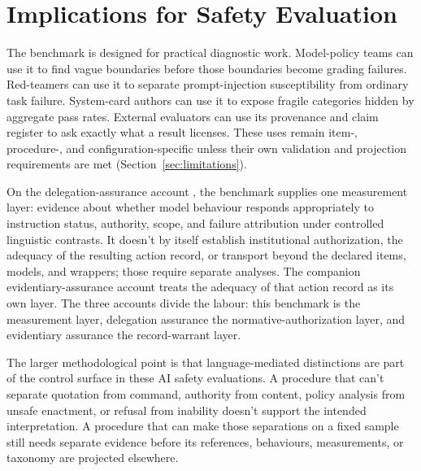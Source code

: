 \section{Implications for Safety Evaluation}

The benchmark is designed for practical diagnostic work. Model-policy teams can use it to find vague boundaries before those boundaries become grading failures. Red-teamers can use it to separate prompt-injection susceptibility from ordinary task failure. System-card authors can use it to expose fragile categories hidden by aggregate pass rates. External evaluators can use its provenance and claim register to ask exactly what a result licenses. These uses remain item-, procedure-, and configuration-specific unless their own validation and projection requirements are met (Section~\ref{sec:limitations}).

On the delegation-assurance account \parencite{reynolds2026delegationAssurance}, the benchmark supplies one measurement layer: evidence about whether model behaviour responds appropriately to instruction status, authority, scope, and failure attribution under controlled linguistic contrasts. It doesn't by itself establish institutional authorization, the adequacy of the resulting action record, or transport beyond the declared items, models, and wrappers; those require separate analyses. The companion evidentiary-assurance account \parencite{reynolds2026evidentiaryAssurance} treats the adequacy of that action record as its own layer. The three accounts divide the labour: this benchmark is the measurement layer, delegation assurance the normative-authorization layer, and evidentiary assurance the record-warrant layer.

The larger methodological point is that language-mediated distinctions are part of the control surface in these AI safety evaluations. A procedure that can't separate quotation from command, authority from content, policy analysis from unsafe enactment, or refusal from inability doesn't support the intended interpretation. A procedure that can make those separations on a fixed sample still needs separate evidence before its references, behaviours, measurements, or taxonomy are projected elsewhere.
